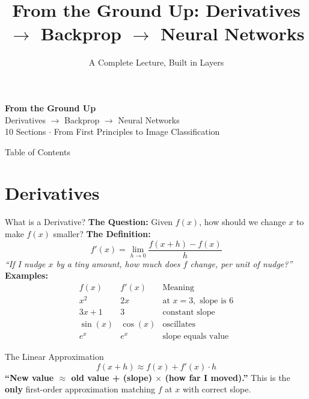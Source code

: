 \documentclass[10pt]{beamer}
\title{\textbf{From the Ground Up: Derivatives $\to$ Backprop $\to$ Neural Networks}}
\subtitle{A Complete Lecture, Built in Layers}
\author{}
\institute{}
\date{}
\begin{document}
\begin{frame}[plain]
    \centering
    \vspace{2cm}
    {\Huge\bfseries From the Ground Up}\\[0.3cm]
    {\LARGE Derivatives $\to$ Backprop $\to$ Neural Networks}\\[0.5cm]
    {\large\color{gray} 10 Sections $\cdot$ From First Principles to Image Classification}
\end{frame}

\begin{frame}{Table of Contents}
    \tableofcontents[hideallsubsections]
\end{frame}

\section{Derivatives}

\begin{frame}{What is a Derivative?}
    \textbf{The Question:} Given $f(x)$, how should we change $x$ to make $f(x)$ smaller?
    \vspace{0.5cm}
    \textbf{The Definition:}
    \[
        f'(x) = \lim_{h \to 0} \frac{f(x+h) - f(x)}{h}
    \]
    \textit{``If I nudge $x$ by a tiny amount, how much does $f$ change, per unit of nudge?''}
    \vspace{0.5cm}
    \textbf{Examples:}
    \[
        \begin{array}{c|c|c}
            f(x) & f'(x) & \text{Meaning} \\
            \hline
            x^2 & 2x & \text{at } x=3, \text{ slope is } 6 \\
            3x+1 & 3 & \text{constant slope} \\
            \sin(x) & \cos(x) & \text{oscillates} \\
            e^x & e^x & \text{slope equals value}
        \end{array}
    \]
\end{frame}

\begin{frame}{The Linear Approximation}
    \[
        f(x + h) \approx f(x) + f'(x) \cdot h
    \]
    \textbf{``New value $\approx$ old value + (slope) $\times$ (how far I moved).''}
    This is the \textbf{only} first-order approximation matching $f$ at $x$ with correct slope.
    \vspace{0.5cm}
\end{frame}
\end{document}

